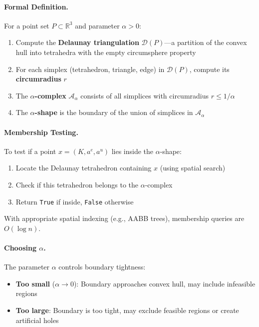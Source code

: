 \paragraph{Formal Definition.}
For a point set $P \subset \mathbb{R}^3$ and parameter $\alpha > 0$:
\begin{enumerate}
    \item Compute the \textbf{Delaunay triangulation} $\mathcal{D}(P)$—a partition of the convex hull into tetrahedra with the empty circumsphere property
    \item For each simplex (tetrahedron, triangle, edge) in $\mathcal{D}(P)$, compute its \textbf{circumradius} $r$
    \item The \textbf{$\alpha$-complex} $\mathcal{A}_\alpha$ consists of all simplices with circumradius $r \leq 1/\alpha$
    \item The \textbf{$\alpha$-shape} is the boundary of the union of simplices in $\mathcal{A}_\alpha$
\end{enumerate}

\paragraph{Membership Testing.}
To test if a point $x = (K, a^e, a^u)$ lies inside the $\alpha$-shape:
\begin{enumerate}
    \item Locate the Delaunay tetrahedron containing $x$ (using spatial search)
    \item Check if this tetrahedron belongs to the $\alpha$-complex
    \item Return \texttt{True} if inside, \texttt{False} otherwise
\end{enumerate}
With appropriate spatial indexing (e.g., AABB trees), membership queries are $O(\log n)$.

\paragraph{Choosing $\alpha$.}
The parameter $\alpha$ controls boundary tightness:
\begin{itemize}
    \item \textbf{Too small} ($\alpha \to 0$): Boundary approaches convex hull, may include infeasible regions
    \item \textbf{Too large}: Boundary is too tight, may exclude feasible regions or create artificial holes
\end{itemize}

